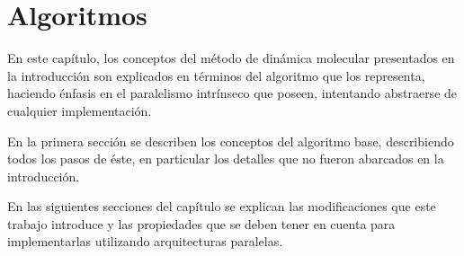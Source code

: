 
\chapter{Algoritmos}


En este capítulo, los conceptos del m\'etodo de dinámica molecular presentados en la introducción son explicados en términos del algoritmo que los representa,
haciendo énfasis en el paralelismo intrínseco que poseen, intentando abstraerse de cualquier implementación.

En la primera sección se describen los conceptos del algoritmo base, describiendo todos los pasos de éste, en particular los detalles que no fueron abarcados en la introducción. 

En las siguientes secciones del capítulo se explican las modificaciones que este trabajo introduce y las propiedades que se deben tener en cuenta para implementarlas utilizando arquitecturas paralelas.








